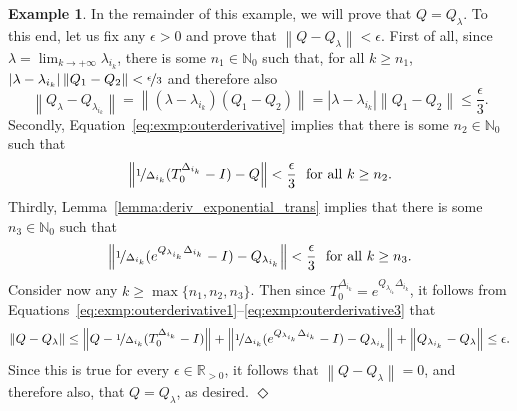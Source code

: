 \documentclass[10pt,a4paper]{paper}
\theoremstyle{definition}
\newtheorem{exmp}{Example}%
\newcommand{\nats}{\mathbb{N}}
\newcommand{\reals}{\mathbb{R}}
\newcommand{\realspos}{\reals_{>0}}
\newcommand{\norm}[1]{\left\lVert #1 \right\rVert}
\newcommand{\abs}[1]{\left\vert #1 \right\vert}
\newcommand{\exampleend}{\hfill$\Diamond$}
\begin{document}
\begin{exmp}
In the remainder of this example, we will prove that $Q=Q_\lambda$. To this end, let us fix any $\epsilon>0$ and prove that $\norm{Q-Q_\lambda}<\epsilon$. First of all, since $\lambda=\lim_{k\to+\infty}\lambda_{i_k}$, there is some $n_1\in\nats_0$ such that, for all $k\geq n_1$, $\abs{\lambda-\lambda_{i_k}}\norm{Q_1-Q_2}<\nicefrac{\epsilon}{3}$ and therefore also
\begin{equation}\label{eq:exmp:outerderivative1}
\norm{Q_\lambda-Q_{\lambda_{i_k}}}
=\norm{(\lambda-\lambda_{i_k})(Q_1-Q_2)}
=\abs{\lambda-\lambda_{i_k}}\norm{Q_1-Q_2}\leq\frac{\epsilon}{3}.
\end{equation}
Secondly, Equation~\eqref{eq:exmp:outerderivative} implies that there is some $n_2\in\nats_0$ such that
\begin{equation}\label{eq:exmp:outerderivative2}
\norm{\nicefrac{1}{\Delta_{i_k}}(T_0^{\Delta_{i_k}}-I)-Q}<\frac{\epsilon}{3}
~\text{ for all $k\geq n_2$}.
\end{equation}
Thirdly, Lemma~\ref{lemma:deriv_exponential_trans} implies that there is some $n_3\in\nats_0$ such that
\begin{equation}\label{eq:exmp:outerderivative3}
\norm{\nicefrac{1}{\Delta_{i_k}}(e^{Q_{\lambda_{i_k}}\Delta_{i_k}}-I)-Q_{\lambda_{i_k}}} < \frac{\epsilon}{3}
~\text{ for all $k\geq n_3$.}
\end{equation}
Consider now any $k\geq\max\{n_1,n_2,n_3\}$. Then since $T_0^{\Delta_{i_k}}=e^{Q_{\lambda_{i_k}}\Delta_{i_k}}$, it follows from Equations~\eqref{eq:exmp:outerderivative1}--\eqref{eq:exmp:outerderivative3} that
\begin{align*}
\norm{Q - Q_{\lambda}} \leq 
\norm{Q-\nicefrac{1}{\Delta_{i_k}}(T_0^{\Delta_{i_k}}-I)}
+
\norm{\nicefrac{1}{\Delta_{i_k}}(e^{Q_{\lambda_{i_k}}\Delta_{i_k}}-I)-Q_{\lambda_{i_k}}}
+
\norm{Q_{\lambda_{i_k}}-Q_\lambda}
\leq\epsilon.
\end{align*}
Since this is true for every $\epsilon\in\realspos$, it follows that $\norm{Q-Q_{\lambda}}=0$, and therefore also, that $Q=Q_\lambda$, as desired.
\exampleend
\end{exmp}
\end{document}
